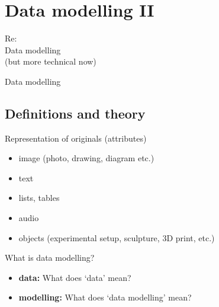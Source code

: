 
\section{Data modelling II}
\begin{frame}[standout]
    Re: \\ \alert{Data modelling} \\
    (but more technical now)
\end{frame}
\begin{frame}{Data modelling}
\subsection{Definitions and theory}
\begin{block}{Representation of originals (attributes)}
\begin{itemize}
    \item image (photo, drawing, diagram etc.)
    \item text 
    \item lists, tables
    \item audio 
    \item objects (experimental setup, sculpture, 3D print, etc.)
\end{itemize}
\end{block}


\begin{block}{What is data modelling?}
\begin{itemize}
    \item \textbf{data:} What does `data' mean?
    \item \textbf{modelling:} What does `data modelling' mean?
\end{itemize}
\end{block}

\end{frame}

